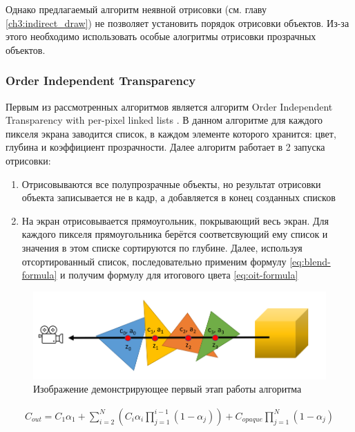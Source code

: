 		Однако предлагаемый алгоритм неявной отрисовки (см. главу \ref{ch3:indirect_draw}) не позволяет установить порядок отрисовки объектов. Из-за этого необходимо использовать особые алогритмы отрисовки прозрачных объектов.		
		
		\subsubsection{Order Independent Transparency} \label{ch3:render_pass:transparents:oit}
			Первым из рассмотренных алгоритмов является алгоритм Order Independent Transparency with per-pixel linked lists \cite{barta2011order}. В данном алгоритме для каждого пикселя экрана заводится список, в каждом элементе которого хранится: цвет, глубина и коэффициент прозрачности. Далее алгоритм работает в 2 запуска отрисовки:
			
			\begin{enumerate}[1.]
				\item Отрисовываются все полупрозрачные объекты, но результат отрисовки объекта записывается не в кадр, а добавляется в конец созданных списков
				\item На экран отрисовывается прямоугольник, покрывающий весь экран. Для каждого пикселя прямоугольника берётся соответсвующий ему список и значения в этом списке сортируются по глубине. Далее, используя отсортированный список, последовательно применим формулу \ref{eq:blend-formula} и получим формулу для итогового цвета \ref{eq:oit-formula}
			\end{enumerate}
			
			\begin{figure}[ht!] 
				\center
				\includegraphics [scale=0.5] {my_folder/images//first_step_oit}	
				\caption{Изображение демонстрирующее первый этап работы алгоритма} 
				\label{fig:first_step_oit}
			\end{figure}
			 
			\begin{equation}
				\label{eq:oit-formula}
				\begin{multlined}	 
			 		C_{out} = C_{1}\alpha_1 + \sum_{i=2}^{N}(C_i\alpha_i\prod _{j=1}^{i - 1}(1 - \alpha_j)) + 
			 		C_{opaque}\prod _{j=1}^{N}(1 - \alpha_j)   
			 	\end{multlined}
			 \end{equation}
			
